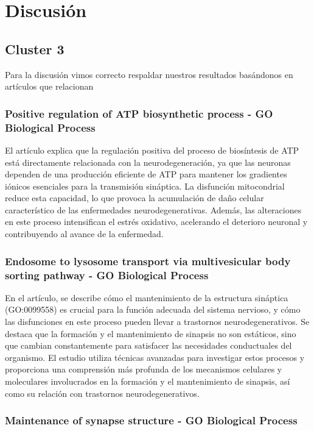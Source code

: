 \section{Discusión}

\subsection{Cluster 3}

Para la discusión vimos correcto respaldar nuestros resultados basándonos en artículos que relacionan 

\subsubsection{Positive regulation of ATP biosynthetic process - GO Biological Process}
El artículo explica que la regulación positiva del proceso de biosíntesis de ATP está directamente relacionada con la neurodegeneración, ya que las neuronas dependen de una producción eficiente de ATP para mantener los gradientes iónicos esenciales para la transmisión sináptica. La disfunción mitocondrial reduce esta capacidad, lo que provoca la acumulación de daño celular característico de las enfermedades neurodegenerativas. Además, las alteraciones en este proceso intensifican el estrés oxidativo, acelerando el deterioro neuronal y contribuyendo al avance de la enfermedad.

\subsubsection{Endosome to lysosome transport via multivesicular body sorting pathway - GO Biological Process}
En el artículo, se describe cómo el mantenimiento de la estructura sináptica (GO:0099558) es crucial para la función adecuada del sistema nervioso, y cómo las disfunciones en este proceso pueden llevar a trastornos neurodegenerativos. Se destaca que la formación y el mantenimiento de sinapsis no son estáticos, sino que cambian constantemente para satisfacer las necesidades conductuales del organismo. El estudio utiliza técnicas avanzadas para investigar estos procesos y proporciona una comprensión más profunda de los mecanismos celulares y moleculares involucrados en la formación y el mantenimiento de sinapsis, así como su relación con trastornos neurodegenerativos.


\subsubsection{Maintenance of synapse structure - GO Biological Process}